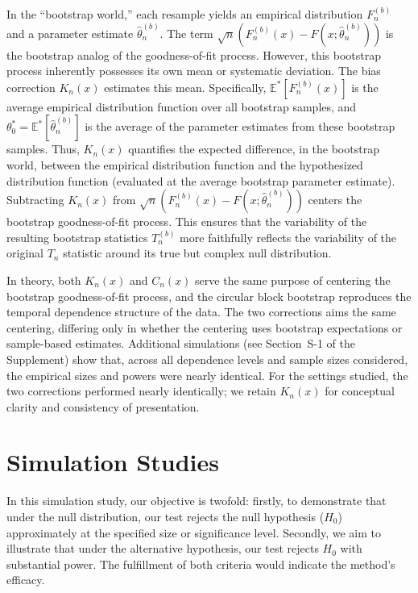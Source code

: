 \documentclass[12pt]{article}
\begin{document}
In the ``bootstrap world,'' each resample yields an empirical distribution 
$F_n^{(b)}$ and a parameter estimate $\hat\theta^{(b)}_n$. The term 
$\sqrt{n}(F_n^{(b)}(x) - F(x;\hat\theta^{(b)}_n))$ is the bootstrap analog of
the goodness-of-fit process. However, this bootstrap process
inherently possesses its own mean or systematic deviation. The bias
correction $K_n(x)$ estimates this mean.
Specifically, $\mathbb{E}^*[F_n^{(b)}(x)]$ is the average empirical
distribution function over all bootstrap samples, and
$\theta^*_0 = \mathbb{E}^*[\hat\theta^{(b)}_n]$ is the average of 
the parameter estimates from these bootstrap samples. Thus, $K_n(x)$
quantifies the expected difference, in the bootstrap world, between
the empirical distribution function and the hypothesized distribution
function (evaluated at the average bootstrap parameter estimate).
Subtracting $K_n(x)$ from
$\sqrt{n}(F_n^{(b)}(x) - F(x;\hat\theta^{(b)}_n))$ centers the 
bootstrap goodness-of-fit process. This ensures that the variability of the resulting 
bootstrap statistics $T_n^{(b)}$ more faithfully reflects the variability of 
the original $T_n$ statistic around its true but complex null
distribution.



In theory, both $K_n(x)$ and $C_n(x)$ serve the same purpose of
centering the bootstrap goodness-of-fit process, and the circular
block bootstrap reproduces the temporal dependence structure of the
data. The two corrections aims the same centering, differing only in
whether the centering uses bootstrap expectations or sample-based
estimates. Additional simulations (see Section~S-1 of the Supplement)
show that, across all dependence levels and sample sizes considered,
the empirical sizes and powers were nearly identical. For the settings
studied, the two corrections performed nearly identically; we retain
$K_n(x)$ for conceptual clarity and consistency of presentation.


\section{Simulation Studies}\label{sec:simu}

In this simulation study, our objective is twofold: firstly, to demonstrate that
under the null distribution, our test rejects the null hypothesis ($H_0$)
approximately at the specified size or significance level. Secondly, we aim to
illustrate that under the alternative hypothesis, our test rejects
$H_0$ with substantial power. The fulfillment of both criteria would indicate
the method's efficacy.
\end{document}
